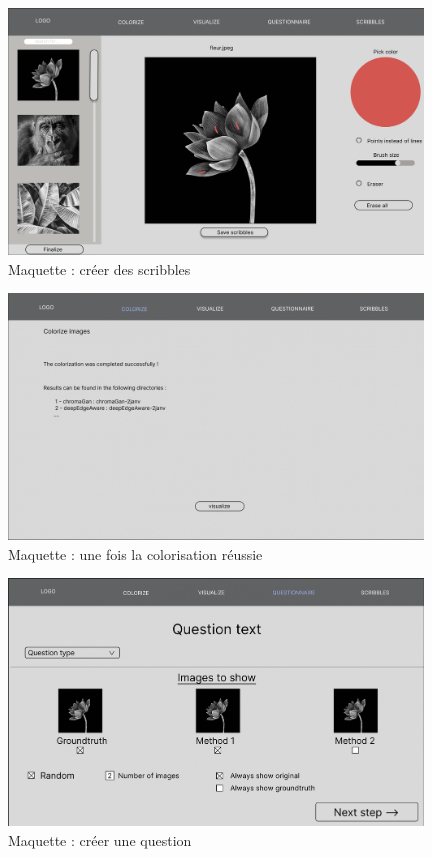 \documentclass{article}
\begin{document}
\begin{figure}[htp]
    \centering
    \includegraphics[width=11cm]{coloriser-scribbles.png}
    \caption{Maquette :  créer des scribbles}
    \label{fig:maquette-coloriser-scribbles}
\end{figure} 

\begin{figure}[htp]
    \centering
    \includegraphics[width=11cm]{coloriser-succes.png}
    \caption{Maquette : une fois la colorisation réussie}
    \label{fig:maquette-coloriser-succes}
\end{figure}

\begin{figure}[htp]
    \centering
    \includegraphics[width=11cm]{questionnaire-creation-question1.png}
    \caption{Maquette : créer une question}
    \label{fig:maquette-questionnaire-creation-question1}
\end{figure}
\end{document}
